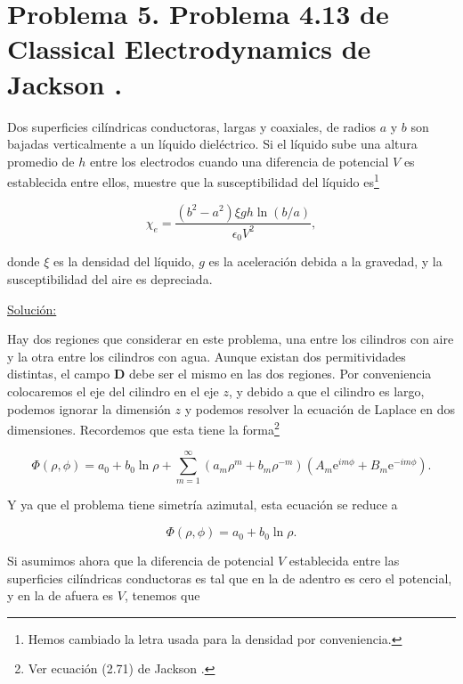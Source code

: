 \documentclass[a4paper,11pt]{article}
\numberwithin{equation}{section}
\newcommand{\euler}{\mathrm{e}}
\begin{document}
\newpage

\section{Problema 5. Problema 4.13 de Classical Electrodynamics
de Jackson \cite{jackson}.}

Dos superficies cilíndricas conductoras, largas y coaxiales, de radios $a$ y $b$ 
son bajadas verticalmente a un líquido dieléctrico. Si el líquido sube una altura 
promedio de $h$ entre los electrodos cuando una diferencia de potencial $V$ es 
establecida entre ellos, muestre que la susceptibilidad del líquido es\footnote{Hemos 
cambiado la letra usada para la densidad por conveniencia.}

$$
\chi_e = \frac{(b^2 - a^2)\xi g h \ln{(b/a)}}{\epsilon_0 V^2},
$$

donde $\xi$ es la densidad del líquido, $g$ es la aceleración debida a la gravedad, 
y la susceptibilidad del aire es depreciada.

\vspace{.3cm}

\underline{Solución:} \vspace{.3cm}

Hay dos regiones que considerar en este problema, una entre los cilindros con aire 
y la otra entre los cilindros con agua. Aunque existan dos permitividades distintas, 
el campo $\mathbf{D}$ debe ser el mismo en las dos regiones. Por conveniencia colocaremos 
el eje del cilindro en el eje $z$, y debido a que el cilindro es largo, podemos 
ignorar la dimensión $z$ y podemos resolver la ecuación de Laplace en dos dimensiones. 
Recordemos que esta tiene la forma\footnote{Ver ecuación (2.71) de Jackson \cite{jackson}.}

\begin{equation}
 \Phi(\rho,\phi) = a_0 + b_0 \ln{\rho} + \sum_{m=1}^\infty (a_m \rho^m + b_m \rho^{-m})
 (A_m \euler^{im\phi} + B_m \euler^{-im\phi}).
\end{equation}

Y ya que el problema tiene simetría azimutal, esta ecuación se reduce a 

\begin{equation}
 \Phi(\rho,\phi) = a_0 + b_0 \ln{\rho}.
\end{equation}

Si asumimos ahora que la diferencia de potencial $V$ establecida entre las superficies 
cilíndricas conductoras es tal que en la de adentro es cero el potencial, y en la 
de afuera es $V$, tenemos que 
\end{document}
